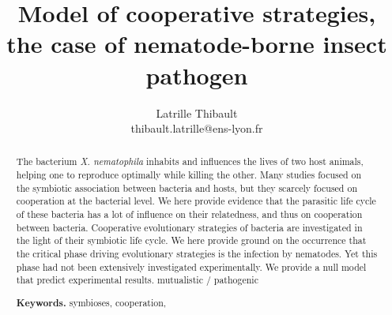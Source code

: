 \documentclass[10pt]{article}
\author{Latrille Thibault\\
\small thibault.latrille@ens-lyon.fr\\[-0.8ex]}
\title{Model of cooperative strategies, the case of nematode-borne insect
pathogen \Xnema}
\newcommand{\Xnema}{\textit{X. nematophila} }
\begin{document}
%
\begin{abstract}
The bacterium \Xnema inhabits and influences the lives of two host animals, helping one to reproduce optimally while killing the other. Many studies focused on the symbiotic association between bacteria and hosts, but they scarcely focused on cooperation at the bacterial level. We here provide evidence that the parasitic life cycle of these bacteria has a lot of influence on their relatedness, and thus on cooperation between bacteria. Cooperative evolutionary strategies of bacteria are investigated in the light of their symbiotic life cycle. We here provide ground on the occurrence that the critical phase driving evolutionary strategies is the infection by nematodes. Yet this phase had not been extensively investigated experimentally. We provide a null model that predict experimental results. 
mutualistic / pathogenic 

\smallskip
\noindent \textbf{Keywords.} symbioses, cooperation, 
\end{abstract}
\end{document}
